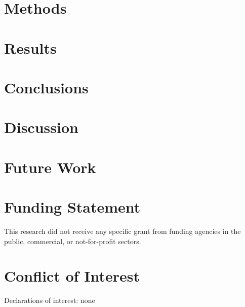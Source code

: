 \documentclass[fleqn]{cas-sc}
\begin{document}
\section{Methods}\label{sec:Methods}


%
%

\section{Results}\label{sec:Results}

\section{Conclusions}\label{Conclusions}

\section{Discussion}\label{Discussion}
%

\section{Future Work}\label{FutureWork}
%


\section*{Funding Statement}

This research did not receive any specific grant from funding agencies in the public, commercial, or not-for-profit sectors.

\section*{Conflict of Interest}

Declarations of interest: none
\end{document}

